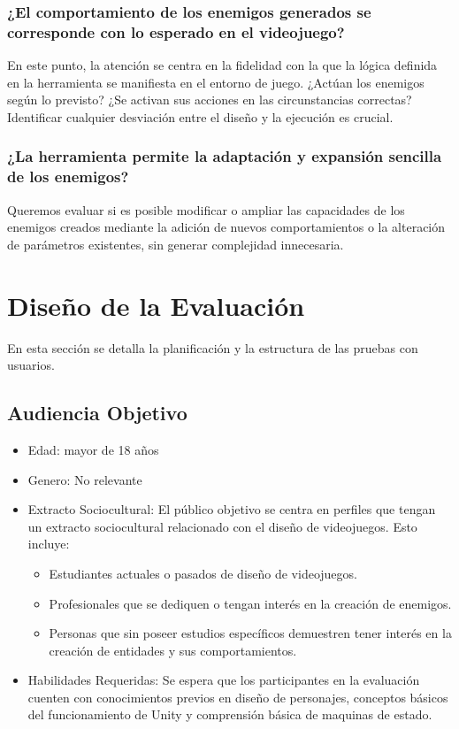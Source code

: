\subsubsection{¿El comportamiento de los enemigos generados se corresponde con lo esperado en el videojuego?}
En este punto, la atención se centra en la fidelidad con la que la lógica definida en la herramienta se manifiesta en el entorno de juego. ¿Actúan los enemigos según lo previsto? ¿Se activan sus acciones en las circunstancias correctas? Identificar cualquier desviación entre el diseño y la ejecución es crucial.\\

\subsubsection{¿La herramienta permite la adaptación y expansión sencilla de los enemigos?}
Queremos evaluar si es posible modificar o ampliar las capacidades de los enemigos creados mediante la adición de nuevos comportamientos o la alteración de parámetros existentes, sin generar complejidad innecesaria.

\section{Diseño de la Evaluación}
En esta sección se detalla la planificación y la estructura de las pruebas con usuarios.

\subsection{Audiencia Objetivo}
\begin{itemize}
\item Edad: mayor de 18 años
\item Genero: No relevante
\item Extracto Sociocultural: El público objetivo se centra en perfiles que tengan un extracto sociocultural relacionado con el diseño de videojuegos. Esto incluye:
\begin{itemize}
\item Estudiantes actuales o pasados de diseño de videojuegos.
\item Profesionales que se dediquen o tengan interés en la creación de enemigos.
\item Personas que sin poseer estudios específicos demuestren tener interés en la creación de entidades y sus comportamientos. 
\end{itemize}

\item Habilidades Requeridas:  Se espera que los participantes en la evaluación cuenten con conocimientos previos en diseño de personajes, conceptos básicos del funcionamiento de Unity y comprensión básica de maquinas de estado.
\end{itemize}

